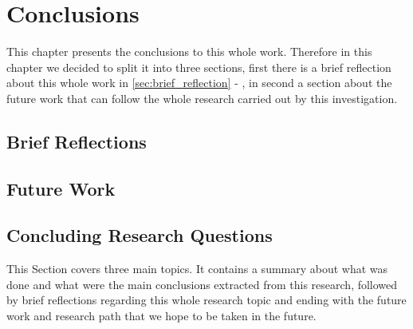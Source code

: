 \glsresetall
\chapter{Conclusions}
\label{chap:conclusions}

This chapter presents the conclusions to this whole work. Therefore in this chapter we decided to split it into three sections, first there is a brief reflection about this whole work in \ref{sec:brief_reflection} - , in second a section about the future work that can follow the whole research carried out by this investigation.

\section{Brief Reflections}
\label{sec:brief_reflections}




\section{Future Work}
\label{sec:future_work}



\section{Concluding Research Questions}
\label{sec:concluding_research_questions}



This Section covers three main topics. It contains a summary about what was done and what were the main conclusions extracted from this research, followed by brief reflections regarding this whole research topic and ending with the future work and research path that we hope to be taken in the future.

